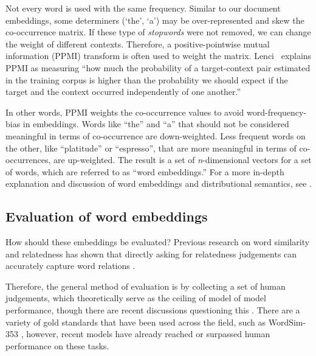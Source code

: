 Not every word is used with the same frequency. Similar to our document embeddings, some determiners (`the', `a') may be over-represented and skew the co-occurrence matrix. If these type of \emph{stopwords} were not removed, we can change the weight of different contexts. Therefore, a positive-pointwise mutual information (PPMI) transform is often used to weight the matrix. Lenci~\cite{lenci2018distributional} explains PPMI as measuring ``how much the probability of a target-context pair estimated in the training corpus is higher than the probability we should expect if the target and the context occurred independently of one another.''

In other words, PPMI weights the co-occurrence values to avoid word-frequency-bias in embeddings. Words like ``the'' and ``a'' that should not be considered meaningful in terms of co-occurrence are down-weighted. Less frequent words on the other, like ``platitude'' or ``espresso'', that are more meaningful in terms of co-occurrences, are up-weighted. The result is a set of \textit{n}-dimensional vectors for a set of words, which are referred to as ``word embeddings.'' For a more in-depth explanation and discussion of word embeddings and distributional semantics, see \cite{lenci2018distributional}.


\subsection{Evaluation of word embeddings}

How should these embeddings be evaluated? Previous research on word similarity and relatedness has shown that directly asking for relatedness judgements can accurately capture word relations \cite{finkelstein2001placing}.

Therefore, the general method of evaluation is by collecting a set of human judgements, which theoretically serve as the ceiling of model of model performance, though there are recent discussions questioning this \cite{richie2022inter}.
There are a variety of gold standards that have been used across the field, such as WordSim-353 \cite{finkelstein2001placing, agirre2009study}, however, recent models have already reached or surpassed human performance on these tasks.

